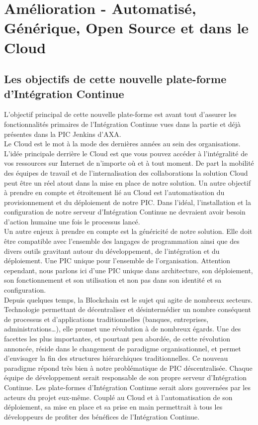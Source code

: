 \chapter{Amélioration - Automatisé, Générique, Open Source et dans le Cloud}

  \section{Les objectifs de cette nouvelle plate-forme d'Intégration Continue}
  L'objectif principal de cette nouvelle plate-forme est avant tout d'assurer les fonctionnalités primaires de l'Intégration Continue vues dans la partie \label{ContinousIntegration} et déjà présentes dans la PIC Jenkins d'AXA.\\

  Le Cloud est le mot à la mode des dernières années au sein des organisations. L'idée principale derrière le Cloud est que vous pouvez accéder à l'intégralité de vos ressources sur Internet de n'importe où et à tout moment. De part la mobilité des équipes de travail et de l'internalisation des collaborations la solution Cloud peut être un réel atout dans la mise en place de notre solution. Un autre objectif à prendre en compte et étroitement lié au Cloud est l'automatisation du provisionnement et du déploiement de notre PIC. Dans l'idéal, l'installation et la configuration de notre serveur d'Intégration Continue ne devraient avoir besoin d'action humaine une fois le processus lancé.\\

  Un autre enjeux à prendre en compte est la généricité de notre solution. Elle doit être compatible avec l'ensemble des langages de programmation ainsi que des divers outils gravitant autour du développement, de l'intégration et du déploiement. Une PIC unique pour l'ensemble de l'organisation. Attention cependant, nous parlons ici d'une PIC unique dans architecture, son déploiement, son fonctionnement et son utilisation et non pas dans son identité et sa configuration.\\

  Depuis quelques temps, la Blockchain est le sujet qui agite de nombreux secteurs. Technologie permettant de décentraliser et désintermédier un nombre conséquent de processus et d’applications traditionnelles (banques, entreprises, administrations…), elle promet une révolution à de nombreux égards. Une des facettes les plus importantes, et pourtant peu abordée, de cette révolution annoncée, réside dans le changement de paradigme organisationnel, et permet d’envisager la fin des structures hiérarchiques traditionnelles. Ce nouveau paradigme répond très bien à notre problématique de PIC déscentralisée. Chaque équipe de développement serait responsable de son propre serveur d'Intégration Continue. Les plate-formes d'Intégration Continue serait alors gouvernées par les acteurs du projet eux-même. Couplé au Cloud et à l'automatisation de son déploiement, sa mise en place et sa prise en main permettrait à tous les développeurs de profiter des bénéfices de l'Intégration Continue.\\


